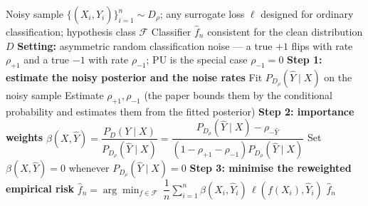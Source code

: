 \documentclass{article}
\begin{document}
\begin{algorithm}[!h]
\renewcommand{\algorithmicrequire}{\textbf{Input:}}
\renewcommand{\algorithmicensure}{\textbf{Output:}}
	\caption{IW$\ell$ (importance reweighting for classification with noisy labels)}
	\begin{algorithmic}[1]
	    \REQUIRE
	    Noisy sample $\{(X_{i},\hat{Y}_{i})\}_{i=1}^{n}\sim D_{\rho}$;
	    any surrogate loss $\ell$ designed for ordinary classification;
	    hypothesis class $\mathcal{F}$
	    \ENSURE
	    Classifier $\hat{f}_{n}$ consistent for the clean distribution $D$
	    \STATE \textbf{Setting:} asymmetric random classification noise --- a true $+1$ flips with
	    rate $\rho_{+1}$ and a true $-1$ with rate $\rho_{-1}$; PU is the special case
	    $\rho_{-1}=0$ %
	    \STATE \textbf{Step 1: estimate the noisy posterior and the noise rates}
	    \STATE Fit $P_{D_{\rho}}(\hat{Y}\mid X)$ on the noisy sample %
	    \STATE Estimate $\rho_{+1},\rho_{-1}$ (the paper bounds them by the conditional
	    probability and estimates them from the fitted posterior)
	    \STATE \textbf{Step 2: importance weights}
	    \STATE $\beta(X,\hat{Y})=\dfrac{P_{D}(Y\mid X)}{P_{D_{\rho}}(\hat{Y}\mid X)}
	    =\dfrac{P_{D_{\rho}}(\hat{Y}\mid X)-\rho_{-\hat{Y}}}
	    {\left(1-\rho_{+1}-\rho_{-1}\right)P_{D_{\rho}}(\hat{Y}\mid X)}$ %
	    \STATE Set $\beta(X,\hat{Y})=0$ whenever $P_{D_{\rho}}(\hat{Y}\mid X)=0$ %
	    \STATE \textbf{Step 3: minimise the reweighted empirical risk}
	    \STATE $\hat{f}_{n}=\arg\min_{f\in\mathcal{F}}\ \dfrac{1}{n}\sum_{i=1}^{n}
	    \beta(X_{i},\hat{Y}_{i})\,\ell\!\left(f(X_{i}),\hat{Y}_{i}\right)$ %
		\RETURN $\hat{f}_{n}$
	\end{algorithmic}
\end{algorithm}
\end{document}
